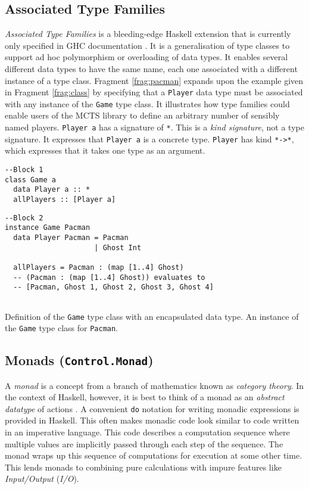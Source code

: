 \subsection{Associated Type Families}
\textit{Associated Type Families} is a bleeding-edge {Haskell} extension that is currently only specified in {GHC} documentation \cite{docs}. It is a generalisation of type classes to support {ad hoc polymorphism} or {overloading} of data types. It enables several different data types to have the same name, each one associated with a different instance of a type class. Fragment \ref{frag:pacman} expands upon the example given in Fragment \ref{frag:class} by specifying that a \verb|Player| data type must be associated with any instance of the \texttt{Game} type class. It illustrates how {type families} could enable users of the {MCTS} library to define an arbitrary number of sensibly named players. \verb|Player a| has a signature of \verb|*|. This is a \textit{kind signature}, not a {type signature}. It expresses that \verb|Player a| is a concrete type. \verb|Player| has kind \verb|*->*|, which expresses that it takes one type as an argument.

\begin{fragment}
\begin{lstlisting}
--Block 1
class Game a                   
  data Player a :: *
  allPlayers :: [Player a]

\end{lstlisting}
\begin{lstlisting}
--Block 2
instance Game Pacman
  data Player Pacman = Pacman
                     | Ghost Int
 
  allPlayers = Pacman : (map [1..4] Ghost) 
  -- (Pacman : (map [1..4] Ghost)) evaluates to
  -- [Pacman, Ghost 1, Ghost 2, Ghost 3, Ghost 4]
    
\end{lstlisting}
\caption{Definition of the \texttt{Game} type class with an encapsulated data type. An instance of the \texttt{Game} type class for \texttt{Pacman}.}
\label{frag:pacman}
\end{fragment}

\subsection{Monads (\texttt{Control.Monad})}
A \textit{monad} is a concept from a branch of mathematics known as \textit{category theory}. In the context of {Haskell}, however, it is best to think of a {monad} as an \textit{abstract datatype} of actions \cite{docs}. A convenient \texttt{do} notation for writing monadic expressions is provided in {Haskell}. This often makes {monadic} code look similar to code written in an imperative language. This code describes a computation sequence where multiple values are implicitly passed through each step of the sequence. The {monad} wraps up this sequence of computations for execution at some other time. This lends monads to combining {pure} calculations with impure features like \textit{Input/Output} (\textit{I/O}). 


